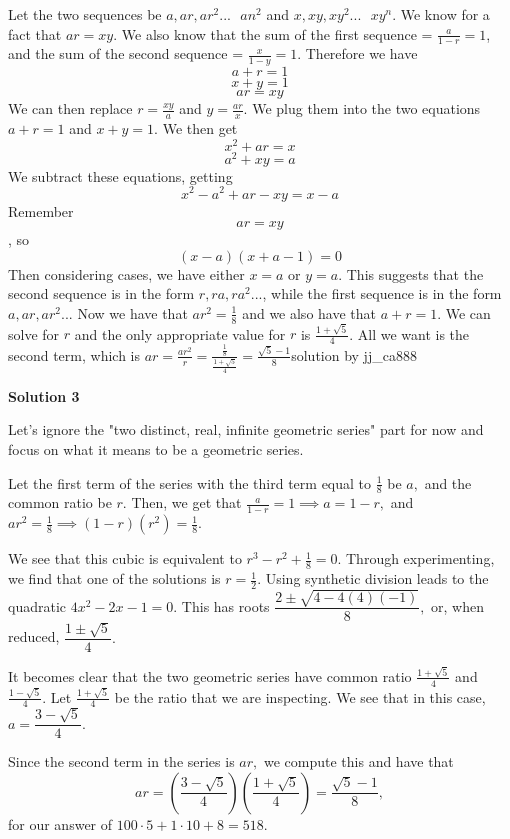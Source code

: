 \begin{enumerate}
Let the two sequences be $a, ar, ar^2 ... \text{ }an^2$ and $x, xy, xy^2 ... \text{ }xy^n$. We know for a fact that $ar = xy$. We also know that the sum of the first sequence = $\frac{a}{1-r} = 1$, and the sum of the second sequence = $\frac{x}{1-y} = 1$. Therefore we have 
 \[a+r = 1\]
 \[x+y = 1\]
 \[ar=xy\] We can then replace $r = \frac{xy}{a}$ and $y = \frac{ar}{x}$. We plug them into the two equations $a+r = 1$ and $x+y = 1$. We then get 
 \[x^2 + ar = x\]
 \[a^2 + xy = a\]We subtract these equations, getting 
 \[x^2 - a^2 + ar - xy = x-a\]Remember 
 \[ar=xy\], so 
 \[(x-a)(x+a-1) = 0\]Then considering cases, we have either $x=a$ or $y=a$. This suggests that the second sequence is in the form $r, ra, ra^2...$, while the first sequence is in the form $a, ar, ar^2...$ Now we have that $ar^2 = \frac18$ and we also have that $a+r = 1$. We can solve for $r$ and the only appropriate value for $r$ is $\frac{1+\sqrt{5}}{4}$. All we want is the second term, which is $ar = \frac{ar^2}{r} = \frac{\frac18}{\frac{1+\sqrt{5}}{4}} = \frac{\sqrt{5} - 1}{8}$solution by jj\_ca888

 



\textbf{Solution 3}

Let's ignore the "two distinct, real, infinite geometric series" part for now and focus on what it means to be a geometric series.

 Let the first term of the series with the third term equal to $\frac18$ be $a,$ and the common ratio be $r.$ Then, we get that $\frac{a}{1-r} = 1 \implies a = 1-r,$ and $ar^2 = \frac18 \implies (1-r)(r^2) = \frac18.$

 We see that this cubic is equivalent to $r^3 - r^2 + \frac18 = 0.$ Through experimenting, we find that one of the solutions is $r = \frac12.$ Using synthetic division leads to the quadratic $4x^2 - 2x - 1 = 0.$ This has roots $\dfrac{2 \pm \sqrt{4 - 4(4)(-1)}}{8},$ or, when reduced, $\dfrac{1 \pm \sqrt{5}}{4}.$

 It becomes clear that the two geometric series have common ratio $\frac{1 + \sqrt{5}}{4}$ and $\frac{1 - \sqrt{5}}{4}.$ Let $\frac{1 + \sqrt{5}}{4}$ be the ratio that we are inspecting. We see that in this case, $a = \dfrac{3 - \sqrt{5}}{4}.$

 Since the second term in the series is $ar,$ we compute this and have that 
 \[ar = \left(\dfrac{3 - \sqrt{5}}{4} \right)\left(\dfrac{1+\sqrt{5}}{4}\right) = \dfrac{\sqrt{5} - 1}{8},\]for our answer of $100 \cdot 5 + 1 \cdot 10 + 8 = \boxed{518}.$


\end{enumerate}
